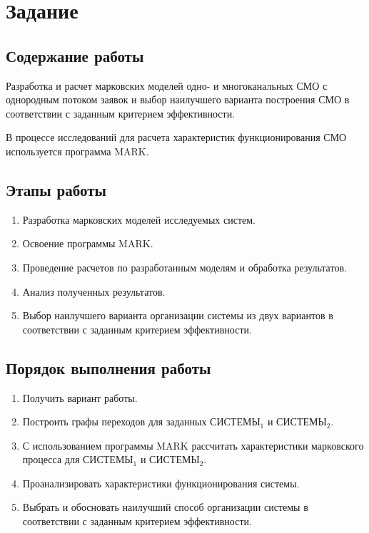 \section{Задание}

\subsection{Содержание работы}

Разработка и расчет марковских моделей одно- и многоканальных СМО с однородным потоком заявок и выбор наилучшего варианта построения СМО в соответствии с заданным критерием эффективности.

В процессе исследований для расчета характеристик функционирования СМО используется программа MARK.

\subsection{Этапы работы}

\begin{enumerate}
    \item Разработка марковских моделей исследуемых систем.
    \item Освоение программы MARK.
    \item Проведение расчетов по разработанным моделям и обработка результатов.
    \item Анализ полученных результатов.
    \item Выбор наилучшего варианта организации системы из двух вариантов в соответствии с заданным критерием эффективности.
\end{enumerate}

\subsection{Порядок выполнения работы}

\begin{enumerate}
    \item Получить вариант работы.
    \item Построить графы переходов для заданных СИСТЕМЫ$_1$ и СИСТЕМЫ$_2$.
    \item С использованием программы MARK рассчитать характеристики марковского процесса для СИСТЕМЫ$_1$ и СИСТЕМЫ$_2$.
    \item Проанализировать характеристики функционирования системы.
    \item Выбрать и обосновать наилучший способ организации системы в соответствии с заданным критерием эффективности.
\end{enumerate}